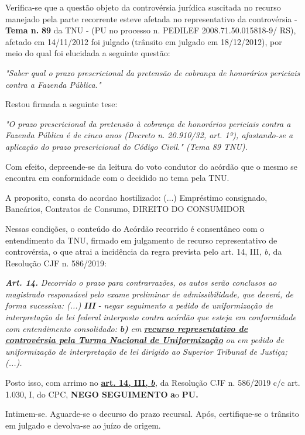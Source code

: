 \documentclass[12pt]{article}
\begin{document}
\justifying
\noindent Verifica-se que a questão objeto da controvérsia jurídica suscitada no recurso manejado pela parte recorrente esteve afetada no representativo da controvérsia - \textbf{Tema n. }\textbf{89} da TNU - (PU no processo n. PEDILEF 2008.71.50.015818-9/ RS),  afetado em 14/11/2012 foi julgado (trânsito em julgado em 18/12/2012), por meio do qual foi elucidada a seguinte questão:

\noindent \textit{"Saber qual o prazo prescricional da pretensão de cobrança de honorários periciais contra a Fazenda Pública."}

\noindent Restou firmada a seguinte tese:

\noindent \textit{"O prazo prescricional da pretensão à cobrança de honorários periciais contra a Fazenda Pública é de cinco anos (Decreto n. 20.910/32, art. 1º), afastando-se a aplicação do prazo prescricional do Código Civil." (Tema 89 TNU).}

\noindent Com efeito, depreende-se da leitura do voto condutor do acórdão que o mesmo se encontra em conformidade com o decidido no  tema pela TNU.

\noindent A proposito, consta do acordao hostilizado: (...) Empréstimo consignado, Bancários, Contratos de Consumo, DIREITO DO CONSUMIDOR

\noindent Nessas condições, o conteúdo do Acórdão recorrido é consentâneo com o entendimento da TNU, firmado em julgamento de recurso representativo de controvérsia, o que atrai a incidência da regra prevista pelo art. 14, III, \textit{b,} da Resolução CJF n. 586/2019:

\noindent \textit{\textbf{Art. 14.}}\textit{ Decorrido o prazo para contrarrazões, os autos serão conclusos ao magistrado responsável pelo exame preliminar de admissibilidade, que deverá, de forma sucessiva: (...) }\textit{\textbf{III }}\textit{- negar seguimento a pedido de uniformização de interpretação de lei federal interposto contra acórdão que esteja em conformidade com entendimento consolidado: }\textit{\textbf{b)}}\textit{ em }\uline{\textit{\textbf{recurso representativo de controvérsia pela Turma Nacional de Uniformização}}}\textit{ ou em pedido de uniformização de interpretação de lei dirigido ao Superior Tribunal de Justiça;(...).}

\noindent Posto isso, com arrimo no \uline{\textbf{art. 14, III, }}\uline{\textit{\textbf{b}}}\textit{,} da Resolução CJF n. 586/2019 c/c art. 1.030, I, do CPC, \textbf{NEGO SEGUIMENTO }\textbf{a}o\textbf{ PU}\textbf{.}

\noindent Intimem-se. Aguarde-se o decurso do prazo recursal. Após, certifique-se o trânsito em julgado e devolva-se ao juízo de origem.
\end{document}
